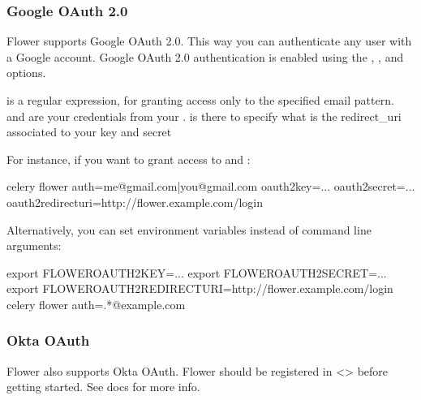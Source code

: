 \documentclass[letterpaper,10pt,english]{sphinxmanual}
\begin{document}
\subsubsection{Google OAuth 2.0}
\label{\detokenize{auth:google-oauth-2-0}}\label{\detokenize{auth:google-oauth}}
Flower supports Google OAuth 2.0. This way you can authenticate any user
with a Google account. Google OAuth 2.0 authentication is enabled using the
, ,  and  options.

 is a regular expression, for granting access only to the specified email pattern.
 and  are your credentials from your .
 is there to specify what is the redirect\_uri associated to your key and secret

For instance, if you want to grant access to  and :

\begin{sphinxVerbatim}[commandchars=\\\{\}]
\PYGZdl{} celery flower \PYGZhy{}\PYGZhy{}auth=\PYGZdq{}me@gmail.com|you@gmail.com\PYGZdq{} \PYGZhy{}\PYGZhy{}oauth2\PYGZus{}key=... \PYGZhy{}\PYGZhy{}oauth2\PYGZus{}secret=... \PYGZhy{}\PYGZhy{}oauth2\PYGZus{}redirect\PYGZus{}uri=http://flower.example.com/login
\end{sphinxVerbatim}

Alternatively, you can set environment variables instead of command line arguments:

\begin{sphinxVerbatim}[commandchars=\\\{\}]
\PYGZdl{} export FLOWER\PYGZus{}OAUTH2\PYGZus{}KEY=...
\PYGZdl{} export FLOWER\PYGZus{}OAUTH2\PYGZus{}SECRET=...
\PYGZdl{} export FLOWER\PYGZus{}OAUTH2\PYGZus{}REDIRECT\PYGZus{}URI=http://flower.example.com/login
\PYGZdl{} celery flower \PYGZhy{}\PYGZhy{}auth=.*@example\PYGZbs{}.com
\end{sphinxVerbatim}


\subsubsection{Okta OAuth}
\label{\detokenize{auth:okta-oauth}}\label{\detokenize{auth:github-oauth}}
Flower also supports Okta OAuth. Flower should be registered in
\textless{}\textgreater{}
before getting started. See  docs for more info.
\end{document}
